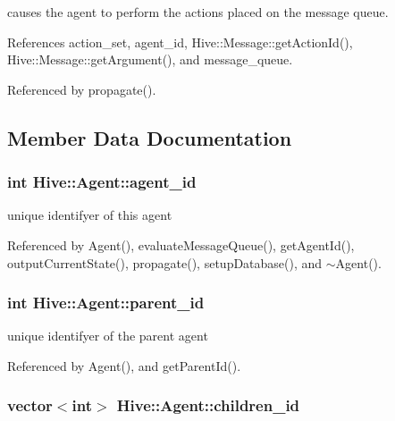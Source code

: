 causes the agent to perform the actions placed on the message queue. 



References action\_\-set, agent\_\-id, Hive::Message::getActionId(), Hive::Message::getArgument(), and message\_\-queue.

Referenced by propagate().

\subsection{Member Data Documentation}
\subsubsection[agent\_\-id]{\setlength{\rightskip}{0pt plus 5cm}int {\bf Hive::Agent::agent\_\-id}\hspace{0.3cm}{\tt  [protected]}}\label{classHive_1_1Agent_91c9681062f0b75a8f3cc38a8752f2c4}


unique identifyer of this agent 



Referenced by Agent(), evaluateMessageQueue(), getAgentId(), outputCurrentState(), propagate(), setupDatabase(), and $\sim$Agent().
\subsubsection[parent\_\-id]{\setlength{\rightskip}{0pt plus 5cm}int {\bf Hive::Agent::parent\_\-id}\hspace{0.3cm}{\tt  [protected]}}\label{classHive_1_1Agent_b6ab3584f5ff74d9a8c498cd4a26a491}


unique identifyer of the parent agent 



Referenced by Agent(), and getParentId().
\subsubsection[children\_\-id]{\setlength{\rightskip}{0pt plus 5cm}vector$<$int$>$ {\bf Hive::Agent::children\_\-id}\hspace{0.3cm}{\tt  [protected]}}\label{classHive_1_1Agent_a9b335d3bd4a0040931ec8a91741ea53}


